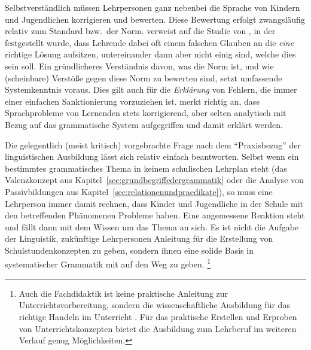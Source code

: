 Selbstverständlich müssen Lehrpersonen ganz nebenbei die Sprache von Kindern und Jugendlichen korrigieren und bewerten.
Diese Bewertung erfolgt zwangsläufig relativ zum Standard bzw.\ der Norm.
\citet[7]{Eisenberg2004} verweist auf die Studie von \citet{Braun1979}, in der festgestellt wurde, dass Lehrende dabei oft einem falschen Glauben an die \textit{eine} richtige Lösung aufsitzen, untereinander dann aber nicht einig sind, welche dies sein soll.
Ein gründlicheres Verständnis davon, was die Norm ist, und wie (scheinbare) Verstöße gegen diese Norm zu bewerten sind, setzt umfassende Systemkenntnis voraus.
Dies gilt auch für die \textit{Erklärung} von Fehlern, die immer einer einfachen Sanktionierung vorzuziehen ist.
\citet[10]{Menzel2017} merkt richtig an, dass Sprachprobleme von Lernenden stets korrigierend, aber selten analytisch mit Bezug auf das grammatische System aufgegriffen und damit erklärt werden.

\Enl[-3] %

Die gelegentlich (meist kritisch) vorgebrachte Frage nach dem "`Praxisbezug"' der linguistischen Ausbildung lässt sich relativ einfach beantworten.
Selbst wenn ein bestimmtes grammatisches Thema in keinem schulischen Lehrplan steht (\zB das Valenzkonzept aus Kapitel~\ref{sec:grundbegriffedergrammatik} oder die Analyse von Passivbildungen aus Kapitel~\ref{sec:relationenundpraedikate}), so muss eine Lehrperson immer damit rechnen, dass Kinder und Jugendliche in der Schule mit den betreffenden Phänomenen Probleme haben.
Eine angemessene Reaktion steht und fällt dann mit dem Wissen um das Thema an sich.
Es ist nicht die Aufgabe der Linguistik, zukünftige Lehrpersonen Anleitung für die Erstellung von Schulstundenkonzepten zu geben, sondern ihnen eine solide Basis in systematischer Grammatik mit auf den Weg zu geben.%
\footnote{Auch die Fachdidaktik ist keine praktische Anleitung zur Unterrichtsvorbereitung, sondern die wissenschaftliche Ausbildung für das richtige Handeln im Unterricht \citep[15]{Bredel2013}.
Für das praktische Erstellen und Erproben von Unterrichtskonzepten bietet die Ausbildung zum Lehrberuf im weiteren Verlauf genug Möglichkeiten.}

